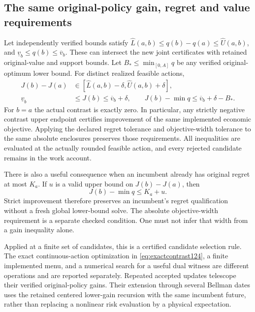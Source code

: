 \subsection{The same original-policy gain, regret and value requirements}

Let independently verified bounds satisfy
$\widehat L(a,b)\le q(b)-q(a)\le\widehat U(a,b)$, and
$\underline v_b\le q(b)\le\overline v_b$. These can intersect the
new joint certificates with retained original-value and support bounds.
Let $B_*\le\min_{[0,A]}q$ be any verified original-optimum lower bound.
For distinct realized feasible actions,
\begin{align}
 J(b)-J(a)&\in
 [\widehat L(a,b)-\delta,\widehat U(a,b)+\delta],\nonumber\\
 \underline v_b&\le J(b)\le\overline v_b+\delta,
 \qquad
 J(b)-\min q\le\overline v_b+\delta-B_*.
 \label{eq:jointpolicy124}
\end{align}
For $b=a$ the actual contrast is exactly zero. In particular, any
strictly negative contrast upper endpoint certifies improvement of the
same implemented economic objective. Applying the declared regret
tolerance and objective-width tolerance to the same absolute enclosures
preserves those requirements. All inequalities are evaluated at the
actually rounded feasible action, and every rejected candidate remains
in the work account.

There is also a useful consequence when an incumbent already has
original regret at most $K_a$. If $u$ is a valid upper bound on
$J(b)-J(a)$, then
\begin{equation}\label{eq:regrettransport124}
                   J(b)-\min q\le K_a+u.
\end{equation}
Strict improvement therefore preserves an incumbent's regret
qualification without a fresh global lower-bound solve. The absolute
objective-width requirement is a separate checked condition. One must
not infer that width from a gain inequality alone.

Applied at a finite set of candidates, this is a certified candidate
selection rule. The exact continuous-action optimization in
\eqref{eq:exactcontrast124}, a finite implemented menu, and a numerical
search for a useful dual witness are different operations and are
reported separately. Repeated accepted updates telescope their verified
original-policy gains. Their extension through several Bellman dates
uses the retained centered lower-gain recursion with the same incumbent
future, rather than replacing a nonlinear risk evaluation by a physical
expectation.

